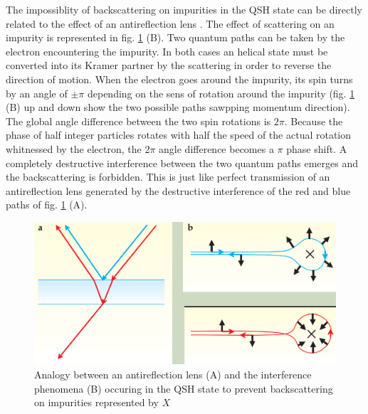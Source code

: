 The impossiblity of backscattering on impurities in the QSH state can be directly related to the effect of an antireflection lens \cite{qi_quantum_2010}. The effect of scattering on an impurity is represented in fig. \ref{lens} (B). Two quantum paths can be taken by the electron encountering the impurity. In both cases an helical state must be converted into its Kramer partner by the scattering in order to reverse the direction of motion. When the electron goes around the impurity, its spin turns by an angle of $\pm \pi$ depending on the sens of rotation around the impurity (fig. \ref{lens} (B) up and down show the two possible paths sawpping momentum direction). The global angle difference between the two spin rotations is $2\pi$. Because the phase of half integer particles rotates with half the speed of the actual rotation whitnessed by the electron, the $2\pi$ angle difference becomes a $\pi$ phase shift. A completely destructive interference between the two quantum paths emerges \cite{barut_path_1992} and the backscattering is forbidden. This is just like perfect transmission of an antireflection lens generated by the destructive interference of the red and blue paths of fig. \ref{lens} (A). 

\begin{figure}
    \includegraphics[scale = 0.7]{sections/visuel/lens.png}
    \caption{Analogy between an antireflection lens (A) and the interference phenomena (B) occuring in the QSH state to prevent backscattering on impurities represented by $X$ \cite{qi_quantum_2010}}
    \label{lens}
\end{figure}




